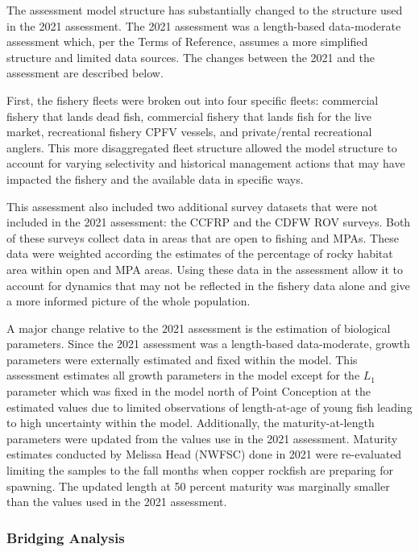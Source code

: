 \documentclass[11pt,
  english,
  letterpaper,
]{article}
\begin{document}
The assessment model structure has substantially changed to the structure used in the 2021 assessment. The 2021 assessment was a length-based data-moderate assessment which, per the Terms of Reference, assumes a more simplified structure and limited data sources. The changes between the 2021 and the assessment are described below.

First, the fishery fleets were broken out into four specific fleets: commercial fishery that lands dead fish, commercial fishery that lands fish for the live market, recreational fishery CPFV vessels, and private/rental recreational anglers. This more disaggregated fleet structure allowed the model structure to account for varying selectivity and historical management actions that may have impacted the fishery and the available data in specific ways.

This assessment also included two additional survey datasets that were not included in the 2021 assessment: the CCFRP and the CDFW ROV surveys. Both of these surveys collect data in areas that are open to fishing and MPAs. These data were weighted according the estimates of the percentage of rocky habitat area within open and MPA areas. Using these data in the assessment allow it to account for dynamics that may not be reflected in the fishery data alone and give a more informed picture of the whole population.

A major change relative to the 2021 assessment is the estimation of biological parameters. Since the 2021 assessment was a length-based data-moderate, growth parameters were externally estimated and fixed within the model. This assessment estimates all growth parameters in the model except for the \(L_1\) parameter which was fixed in the model north of Point Conception at the estimated values due to limited observations of length-at-age of young fish leading to high uncertainty within the model. Additionally, the maturity-at-length parameters were updated from the values use in the 2021 assessment. Maturity estimates conducted by Melissa Head (NWFSC) done in 2021 were re-evaluated limiting the samples to the fall months when copper rockfish are preparing for spawning. The updated length at 50 percent maturity was marginally smaller than the values used in the 2021 assessment.

\hypertarget{bridging-analysis}{%
\subsubsection{Bridging Analysis}\label{bridging-analysis}}
\end{document}
